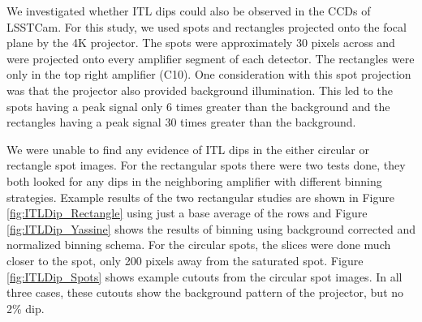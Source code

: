 We investigated whether ITL dips could also be observed in the CCDs of
LSSTCam. For this study, we used spots and rectangles projected onto the focal plane by the 4K
projector. The spots were approximately 30 pixels across
and were projected onto every amplifier segment of each detector. The rectangles were only
in the top right amplifier (C10). One consideration with this spot
projection was that the projector also provided background illumination. This led to the spots having a peak signal only 6 times greater
than the background and the rectangles having a peak signal 30 times greater
than the background.

We were unable to find any evidence of ITL
dips in the either circular or rectangle spot images. For the rectangular spots there were two tests done, they both looked for any dips in the neighboring amplifier with different binning strategies. Example results of the two rectangular studies are shown in Figure \ref{fig:ITLDip_Rectangle} using just a base average of the rows and Figure \ref{fig:ITLDip_Yassine} shows the results of binning using background corrected and normalized binning schema. For the circular spots, the slices were done much closer to the spot, only 200 pixels away from the saturated spot. Figure \ref{fig:ITLDip_Spots} shows example cutouts from the circular spot images. In all three cases, these cutouts show the background
pattern of the projector, but no 2\% dip.

